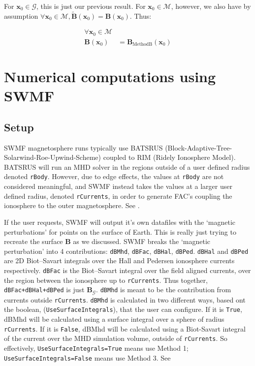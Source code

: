 \documentclass{article}
\newcommand\B{\mathbf{B}}
\newcommand\x{\mathbf{x}}
\newcommand\M{\mathcal{M}}
\newcommand\G{\mathcal{G}}
\begin{document}
For $\x_0 \in \G$, this is just our previous result.
For $\x_0 \in \M$, however, we also have by assumption $\forall \x_0 \in \M, \tilde{\B}(\x_0) = \B(\x_0)$.
Thus:

\begin{align}
\forall \x_0 \in \M \\
    \B(\x_0) &= \B_{\text{MethodB}}(\x_0)
\end{align}

\section{Numerical computations using SWMF} \label{computations}

\subsection{Setup}

SWMF magnetosphere runs typically use BATSRUS (Block-Adaptive-Tree-Solarwind-Roe-Upwind-Scheme) coupled to RIM (Ridely Ionosphere Model).
BATSRUS will run an MHD solver in the regions outside of a user defined radius denoted \texttt{rBody}.
However, due to edge effects, the values at \texttt{rBody} are not considered meaningful, and SWMF instead takes the values at a larger user defined radius, denoted \texttt{rCurrents}, in order to generate FAC's coupling the ionosphere to the outer magnetosphere. See \citep{Toth2005}.

If the user requests, SWMF will output it's own datafiles with the `magnetic perturbations' for points on the surface of Earth.
This is really just trying to recreate the surface $\B$ as we discussed.
SWMF breaks the `magnetic perturbation' into 4 contributions:
\texttt{dBMhd}, \texttt{dBFac}, \texttt{dBHal}, \texttt{dBPed}.
\texttt{dBHal} and \texttt{dBPed} are 2D Biot--Savart integrals over the Hall and Pedersen ionosphere currents respectively.
\texttt{dBFac} is the Biot--Savart integral over the field aligned currents, over the region between the ionosphere up to \texttt{rCurrents}.
Thus together, \texttt{dBFac+dBHal+dBPed} is just $\B_{\G}$.
\texttt{dBMhd} is meant to be the contribution from currents outside \texttt{rCurrents}.
\texttt{dBMhd} is calculated in two different ways, based ont the boolean, (\texttt{UseSurfaceIntegrals}), that the user can configure.
If it is \texttt{True}, dBMhd will be calculated
using a surface integral over a sphere of radius \texttt{rCurrents}.
If it is \texttt{False}, dBMhd will be calculated
using a Biot-Savart integral of the current over the
MHD simulation volume, outside of \texttt{rCurrents}.
So effectively,
\texttt{UseSurfaceIntegrals=True} means use Method 1;
\texttt{UseSurfaceIntegrals=False} means use Method 3. See \citep{swmfmanual}
\end{document}
